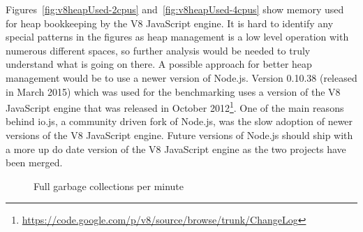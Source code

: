 \noindent
Figures~\ref{fig:v8heapUsed-2cpus} and~\ref{fig:v8heapUsed-4cpus} show memory used for heap bookkeeping by the V8 JavaScript engine. It is hard to identify any special patterns in the figures as heap management is a low level operation with numerous different spaces, so further analysis would be needed to truly understand what is going on there. A possible approach for better heap management would be to use a newer version of Node.js. Version 0.10.38 (released in March 2015) which was used for the benchmarking uses a version of the V8 JavaScript engine that was released in October 2012\footnote{\url{https://code.google.com/p/v8/source/browse/trunk/ChangeLog}}. One of the main reasons behind io.js, a community driven fork of Node.js, was the slow adoption of newer versions of the V8 JavaScript engine. Future versions of Node.js should ship with a more up do date version of the V8 JavaScript engine as the two projects have been merged.
\newpage
\begin{figure}[h!]
	\centering
	 \hfill
	\caption{Full garbage collections per minute}
\end{figure}

